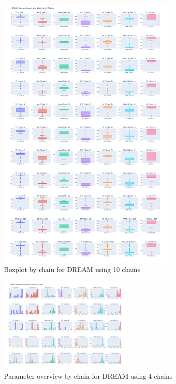 \begin{figure}[H]
    \centering
    \includegraphics[width=0.8\textwidth]{figures/dream/boxplot_10.png}
    \captionsetup{width=.8\textwidth}
    \caption{Boxplot by chain for DREAM using 10 chains}
    \label{fig:enter-label}
\end{figure}

\begin{figure}[H]
    \centering
    \includegraphics[width=0.6\textwidth]{figures/dream/param_overview_4.png}
    \captionsetup{width=.8\textwidth}
    \caption{Parameter overview by chain for DREAM using 4 chains}
    \label{fig:enter-label}
\end{figure}

